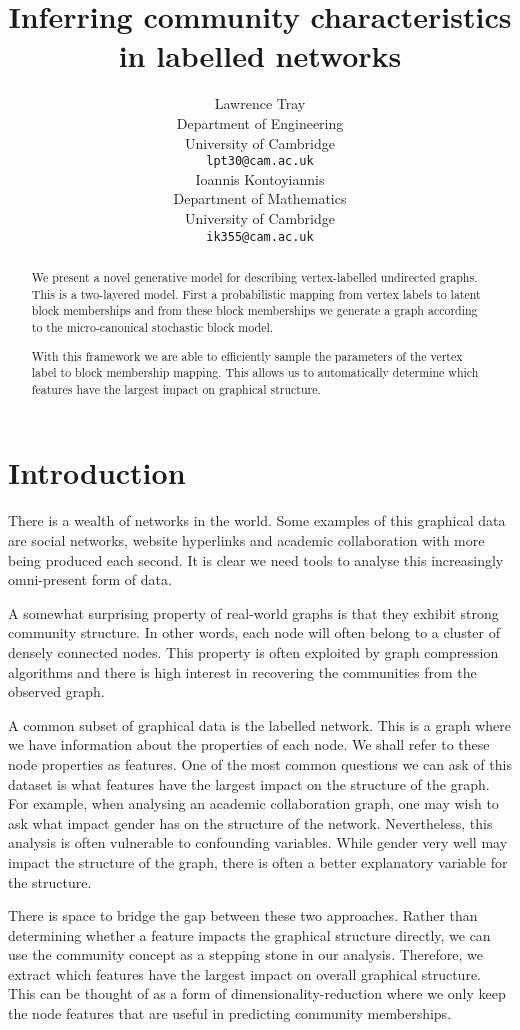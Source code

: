 \documentclass{article}
\title{Inferring community characteristics in labelled networks}
\author{
  Lawrence Tray \\
  Department of Engineering \\
  University of Cambridge \\
  \texttt{lpt30@cam.ac.uk} \\
  \And
  Ioannis Kontoyiannis \\
  Department of Mathematics \\
  University of Cambridge \\
  \texttt{ik355@cam.ac.uk}
}
\begin{document}
\maketitle

\begin{abstract}
We present a novel generative model for describing vertex-labelled undirected graphs. This is a two-layered model. First a probabilistic mapping from vertex labels to latent block memberships and from these block memberships we generate a graph according to the micro-canonical stochastic block model.

With this framework we are able to efficiently sample the parameters of the vertex label to block membership mapping. This allows us to automatically determine which features have the largest impact on graphical structure.
\end{abstract}


\section{Introduction}

There is a wealth of networks in the world. Some examples of this graphical data are social networks, website hyperlinks and academic collaboration with more being produced each second. It is clear we need tools to analyse this increasingly omni-present form of data.

A somewhat surprising property of real-world graphs is that they exhibit strong community structure. In other words, each node will often belong to a cluster of densely connected nodes. This property is often exploited by graph compression algorithms and there is high interest in recovering the communities from the observed graph.

A common subset of graphical data is the labelled network. This is a graph where we have information about the properties of each node. We shall refer to these node properties as features. One of the most common questions we can ask of this dataset is what features have the largest impact on the structure of the graph. For example, when analysing an academic collaboration graph, one may wish to ask what impact gender has on the structure of the network.  Nevertheless, this analysis is often vulnerable to confounding variables. While gender very well may impact the structure of the graph, there is often a better explanatory variable for the structure.

There is space to bridge the gap between these two approaches. Rather than determining whether a feature impacts the graphical structure directly, we can use the community concept as a stepping stone in our analysis. Therefore, we extract which features have the largest impact on overall graphical structure. This can be thought of as a form of dimensionality-reduction where we only keep the node features that are useful in predicting community memberships.
\end{document}

